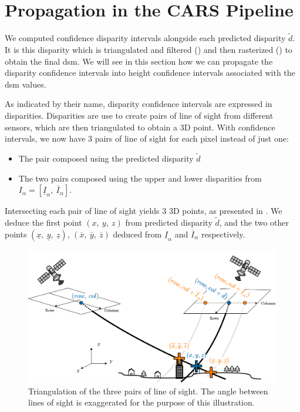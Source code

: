 \section{Propagation in the CARS Pipeline}
We computed confidence disparity intervals alongside each predicted disparity $\tilde{d}$. It is this disparity which is triangulated and filtered () and then rasterized () to obtain the final \acrshort{dsm}. We will see in this section how we can propagate the disparity confidence intervals into height confidence intervals associated with the \acrshort{dsm} values.

As indicated by their name, disparity confidence intervals are expressed in disparities. Disparities are use to create pairs of line of sight from different sensors, which are then triangulated to obtain a 3D point. With confidence intervals, we now have 3 pairs of line of sight for each pixel instead of just one:
\begin{itemize}
    \item The pair composed using the predicted disparity $\tilde{d}$
    \item The two pairs composed using the upper and lower disparities from $I_\alpha=[\underline{I}_\alpha, ~\overline{I}_\alpha]$.
\end{itemize}
Intersecting each pair of line of sight yields $3$ 3D points, as presented in . We deduce the first point $(x, ~y, ~z)$ from predicted disparity $\tilde{d}$, and the two other points $(\underline{x}, ~\underline{y}, ~\underline{z})$, $(\overline{x}, ~\overline{y}, ~\overline{z})$ deduced from $\underline{I}_\alpha$ and $\overline{I}_\alpha$ respectively.
\begin{figure}
    \centering
    \includegraphics[width=\linewidth]{Images/Chap_5/Pairs_of_line_of_sight.png}
    \caption{Triangulation of the three pairs of line of sight. The angle between lines of sight is exaggerated for the purpose of this illustration.}
    \label{fig:pairs_of_line_of_sight}
\end{figure}

